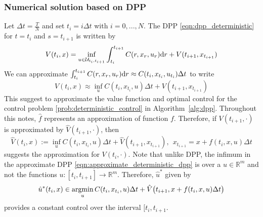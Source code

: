\documentclass[11pt]{book}
\newcommand{\dr}{\text{\normalfont d}r}
\begin{document}
\subsubsection{Numerical solution based on DPP}
Let $\Delta t = \frac{T}{N}$ and set $t_i=i\Delta t$ with $i=0,...,N$. The DPP \eqref{eqn:dpp_deterministic} for $t=t_i$ and $s=t_{i+1}$ is written by
\begin{equation}
    V(t_{i},x) =\inf_{u\in\mathcal{U}_{t_i,t_{i+1}}}\int_{t_i}^{t_{i+1}}C(r,x_r,u_r){{\dr}}+V(t_{i+1},x_{t_{i+1}})
\end{equation}
We can approximate $\int_{t_i}^{t_{i+1}}C(r,x_r,u_r){{\dr}}\approx C(t_i,x_{t_i},u_{t_i})\Delta t$ to write
\begin{equation}
    V(t_{i},x) \approx\inf_{u}C(t_{i},x_{t_{i}},u){{\Delta t}}+V(t_{i+1},x_{t_{i+1}})
\end{equation}
This suggest to approximate the value function and optimal control for the control problem \eqref{prob:deterministic_control} in Algorithm~\ref{alg:dpp}. Throughout this notes, $\hat{f}$ represents an approximation of function $f$. 
Therefore, if $V(t_{i+1},\cdot)$ is approximated by  $\hat{V}(t_{i+1},\cdot)$, then 
\begin{equation}\label{eqn:approximate_deterministic_dpp}
    \hat{V}(t_{i},x):=\inf_{u}C(t_{i},x_{t_{i}},u){{\Delta t}}+\hat{V}(t_{i+1},x_{t_{i+1}}),~~x_{t_{i+1}} = x + f(t_i,x,u)\Delta t 
\end{equation}
suggests the approximation for $V(t_{i},\cdot)$. Note that unlike DPP,  the infimum  in the approximate DPP \eqref{eqn:approximate_deterministic_dpp} is over a $u\in\mathbb{R}^m$ and not the functions $u:[t_i,t_{i+1}]\to\mathbb{R}^m$. Therefore, $\hat{u}^*$ given by 
\[
\hat{u}^*(t_i,x)\in\mathop{\text{\normalfont argmin}}_{u}C(t_{i},x_{t_{i}},u){{\Delta t}}+\hat{V}\big(t_{i+1},x + f(t_i,x,u)\Delta t\big)  
\]
provides a constant control over the interval $[t_i,t_{i+1}$.
\end{document}
